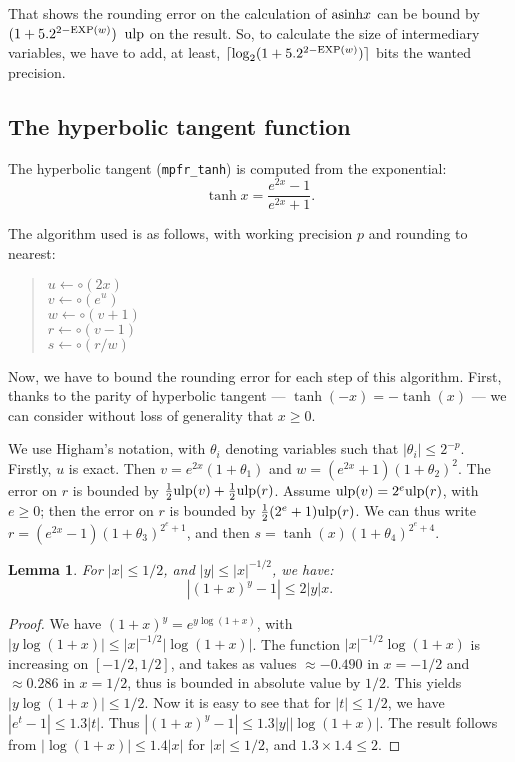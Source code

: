 \documentclass[12pt]{amsart}
\def\n{\textnormal}
\def\ulp{{\rm ulp}}
\def\Exp{{\rm EXP}}
\newtheorem{lemma}{Lemma}
\begin{document}
That shows the rounding error on the calculation of $\n{asinh} x$ can
be bound by $ (1+5.2^{2-\Exp(w)})\;\; \ulp$ on the result. So, to
calculate the size of intermediary variables, we have to add, at
least, $\lceil \log_2 (1+5.2^{2-\Exp(w)}) \rceil$ bits the wanted
precision.

\subsection{The hyperbolic tangent function}

The hyperbolic tangent (\texttt{mpfr\_tanh}) is computed from the exponential:
\[ \tanh x = \frac{ e^{2 x} -1 }{ e^{2 x} +1}. \]

The algorithm used is as follows, with working
precision $p$ and rounding to nearest:
\begin{quote}
$u \leftarrow \circ(2 x)$ \\
$v \leftarrow \circ(e^u)$ \\
$w \leftarrow \circ(v+1)$ \\
$r \leftarrow \circ(v-1)$ \\
$s \leftarrow \circ(r/w)$
\end{quote}
Now, we have to bound the rounding error for each step of this
algorithm.  First, thanks to the parity of hyperbolic tangent
--- $\tanh(-x)=-\tanh(x)$ --- we can consider without loss of generality
that $x \geq 0$.

We use Higham's notation, with $\theta_i$ denoting variables such that
$|\theta_i| \leq 2^{-p}$.
Firstly, $u$ is exact. Then $v = e^{2x} (1+\theta_1)$ and
$w = (e^{2x}+1) (1+\theta_2)^2$.
The error on $r$ is bounded by $\frac{1}{2} \ulp(v) + \frac{1}{2} \ulp(r)$.
Assume $\ulp(v) = 2^e \ulp(r)$, with $e \geq 0$;
then the error on $r$ is bounded by $\frac{1}{2} (2^e+1) \ulp(r)$.
We can thus write $r = (e^{2x}-1) (1+\theta_3)^{2^e+1}$,
and then $s = \tanh(x) (1+\theta_4)^{2^e+4}$.

\begin{lemma}
For $|x| \leq 1/2$, and $|y| \leq |x|^{-1/2}$, we have:
\[ |(1+x)^y-1| \leq 2 |y| x. \]
\end{lemma}
\begin{proof}
We have $(1+x)^y = e^{y \log (1+x)}$,
with $|y \log (1+x)| \leq |x|^{-1/2} |\log (1+x)|$.
The function $|x|^{-1/2} \log (1+x)$ is increasing on $[-1/2,1/2]$, and
takes as values $\approx -0.490$ in $x=-1/2$ and $\approx 0.286$ in $x=1/2$,
thus is bounded in absolute value by $1/2$.
This yields $|y \log (1+x)| \leq 1/2$.
Now it is easy to see that for $|t| \leq 1/2$, we have
$|e^t-1| \leq 1.3 |t|$.
Thus $|(1+x)^y-1| \leq 1.3 |y| |\log (1+x)|$.
The result follows from $|\log (1+x)| \leq 1.4 |x|$ for $|x| \leq 1/2$,
and $1.3 \times 1.4 \leq 2$.
\end{proof}
\end{document}
